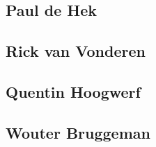 \documentclass[../main.tex]{subfiles}
\begin{document}
\subsection{Paul de Hek}
\subsection{Rick van Vonderen}
\subsection{Quentin Hoogwerf}
\subsection{Wouter Bruggeman}
\end{document}
